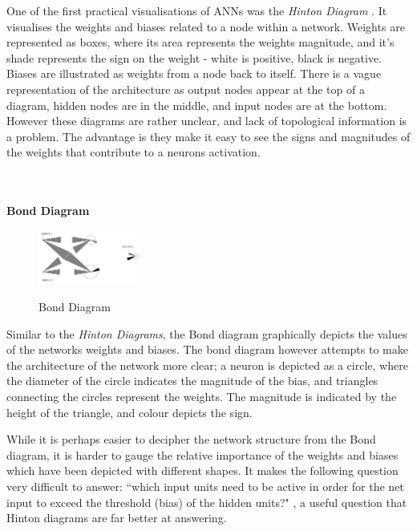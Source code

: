 \documentclass[a4paper,11pt,titlepage]{article}
\begin{document}
		One of the first practical visualisations of ANNs was the \textit{Hinton Diagram} \cite{Hinton1986}. It visualises the weights and biases related to a node within a network. Weights are represented as boxes, where its area represents the weights magnitude, and it's shade represents the sign on the weight - white is positive, black is negative. Biases are illustrated as weights from a node back to itself. There is a vague representation of the architecture as output nodes appear at the top of a diagram, hidden nodes are in the middle, and input nodes are at the bottom. However these diagrams are rather unclear, and lack of topological information is a problem. The advantage is they make it easy to see the signs and magnitudes of the weights that contribute to a neurons activation.
		\\\
		\\\
		
\textbf{Bond Diagram}		
 	\begin{figure}[H]
    			\centering	
			{{\includegraphics[width=0.3\textwidth]
    				{img/craven_bond.png} 
    			}}%
    			\caption{Bond Diagram}%
    		\label{fig:bond}
	\end{figure} 
 		
		Similar to the \textit{Hinton Diagrams}, the Bond diagram \cite{Wejchert1990} graphically depicts the values of the networks weights and biases. The bond diagram however attempts to make the architecture of the network more clear; a neuron is depicted as a circle, where the diameter of the circle indicates the magnitude of the bias, and triangles connecting the circles represent the weights. The magnitude is indicated by the height of the triangle, and colour depicts the sign. 
		\par 
		While it is perhaps easier to decipher the network structure from the Bond diagram, it is harder to gauge the relative importance of the weights and biases which have been depicted with different shapes. It makes the following question very difficult to answer: ``which input units need to be active in order for the net input to exceed the threshold (bias) of the hidden units?" \cite{Craven1992}, a useful question that Hinton diagrams are far better at answering.
		\par 
		
\end{document}
